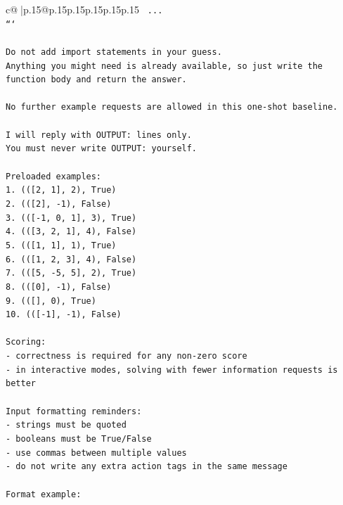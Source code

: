 \documentclass{article}
\begin{document}
{\begin{supertabular}{c@{$\;$}|p{.15\linewidth}@{}p{.15\linewidth}p{.15\linewidth}p{.15\linewidth}p{.15\linewidth}p{.15\linewidth}}
{{{\texttt{    ...} \\
\texttt{```} \\
\\ 
\texttt{Do not add import statements in your guess.} \\
\texttt{Anything you might need is already available, so just write the function body and return the answer.} \\
\\ 
\texttt{No further example requests are allowed in this one{-}shot baseline.} \\
\\ 
\texttt{I will reply with OUTPUT: lines only.} \\
\texttt{You must never write OUTPUT: yourself.} \\
\\ 
\texttt{Preloaded examples:} \\
\texttt{1. (({[}2, 1{]}, 2), True)} \\
\texttt{2. (({[}2{]}, {-}1), False)} \\
\texttt{3. (({[}{-}1, 0, 1{]}, 3), True)} \\
\texttt{4. (({[}3, 2, 1{]}, 4), False)} \\
\texttt{5. (({[}1, 1{]}, 1), True)} \\
\texttt{6. (({[}1, 2, 3{]}, 4), False)} \\
\texttt{7. (({[}5, {-}5, 5{]}, 2), True)} \\
\texttt{8. (({[}0{]}, {-}1), False)} \\
\texttt{9. (({[}{]}, 0), True)} \\
\texttt{10. (({[}{-}1{]}, {-}1), False)} \\
\\ 
\texttt{Scoring:} \\
\texttt{{-} correctness is required for any non{-}zero score} \\
\texttt{{-} in interactive modes, solving with fewer information requests is better} \\
\\ 
\texttt{Input formatting reminders:} \\
\texttt{{-} strings must be quoted} \\
\texttt{{-} booleans must be True/False} \\
\texttt{{-} use commas between multiple values} \\
\texttt{{-} do not write any extra action tags in the same message} \\
\\ 
\texttt{Format example:} \\
}}}
\end{supertabular}}
\end{document}
